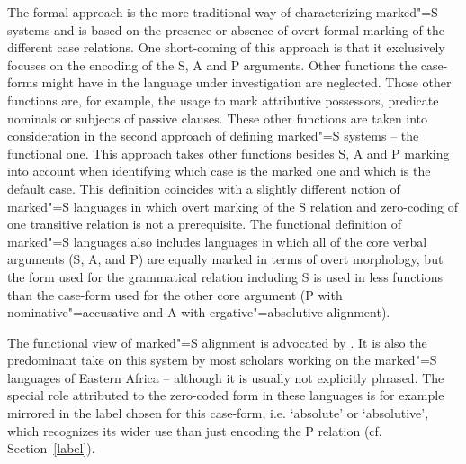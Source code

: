 The formal approach is the more traditional way of characterizing marked"=S systems and is based on the presence or absence of overt formal marking of the different case relations. 
One short-coming of this approach is that it exclusively focuses on the encoding of the S, A and P arguments. Other functions the case-forms might have in the language under investigation are neglected. 
Those other functions are, for example, the usage to mark attributive possessors, predicate nominals or subjects of passive clauses. 
These other functions are taken into consideration in the second approach of defining marked"=S systems -- the functional one. 
This approach takes other functions besides S, A and P marking into account when identifying which case is the marked one and which is the default case. 
This definition coincides with a slightly different notion of marked"=S languages in which overt marking of the S relation and zero-coding of one transitive relation is not a prerequisite. 
The functional definition of marked"=S languages also includes languages in which all of the core verbal arguments (S, A, and P) are equally marked in terms of overt morphology, but the form used for the grammatical relation including S is used in less functions than the case-form used for the other core argument (P with nominative"=accusative and A with ergative"=absolutive alignment). 

The functional view of marked"=S alignment is advocated by \citet{Koenig:2006}. 
It is also the predominant take on this system by most scholars working on the marked"=S languages of Eastern Africa -- although it is usually not explicitly phra\-sed. 
The special role attributed to the zero-coded form in these languages is for example mirrored in the label chosen for this case-form, i.e. `absolute' or `absolutive', which recognizes its wider use than just encoding the P relation (cf. Section~\ref{label}).  

